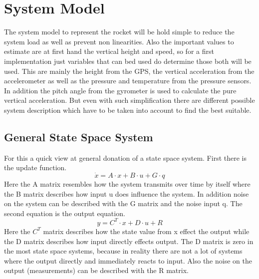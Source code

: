   \section{System Model}
  The system model to represent the rocket will be hold simple to reduce the system load as well as prevent non linearities.
  Also the important values to estimate are at first hand the vertical height and speed, so
  for a first implementation just variables that can bed used do determine those both will be used.
  This are mainly the height from the GPS, the vertical acceleration from the accelerometer
  as well as the pressure and temperature from the pressure sensors. In addition the pitch angle from the gyrometer is used to calculate the pure vertical acceleration.
  But even with such simplification there are different possible system description which have to be taken into account 
  to find the best suitable.
  
  \subsection{General State Space System}
  For this a quick view at general donation of a state space system. First there is the update function.
  $$ \dot{x} = A \cdot x + B \cdot u + G \cdot q$$
  Here the A matrix resembles how the system transmits over time by itself where the B matrix describes how input u does influence the system.
  In addition noise on the system can be described with the G matrix and the noise input q.
  The second equation is the output equation.
  $$ y = C^T \cdot x + D \cdot u + R $$
  Here the $C^T$ matrix describes how the state value from x effect the output while the D matrix describes how input directly effects output.
  The D matrix is zero in the most state space systems, because in reality there are not a lot of systems where the output directly and immediately reacts to input.
  Also the noise on the output (measurements) can be described with the R matrix.
  
